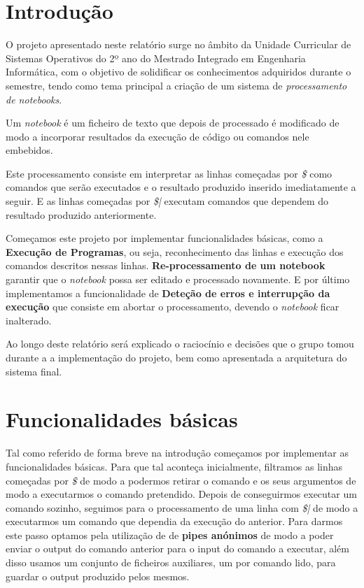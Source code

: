 \documentclass{report}
\begin{document}
\tableofcontents

\chapter{Introdução} \label{intro}

O projeto apresentado neste relatório surge no âmbito da Unidade Curricular de Sistemas Operativos do 2º ano do Mestrado Integrado em Engenharia Informática, com o objetivo de solidificar os conhecimentos adquiridos durante o semestre, tendo como tema principal a criação de um sistema de \textit{processamento de notebooks}. 

Um \textit{notebook} é um ficheiro de texto que depois de processado é modificado de modo a incorporar resultados da execução de código ou comandos nele embebidos.

Este processamento consiste em interpretar as linhas começadas por \textit{\$} como comandos que serão executados e o resultado produzido inserido imediatamente a seguir. E as linhas começadas por \textit{\$|} executam comandos que dependem do resultado produzido anteriormente.

Começamos este projeto por implementar funcionalidades básicas, como a \textbf{Execução de Programas}, ou seja, reconhecimento das linhas e execução dos comandos descritos nessas linhas. \textbf{Re-processamento de um notebook} garantir que o \textit{notebook} possa ser editado e processado novamente. E por último implementamos a funcionalidade de \textbf{ Deteção de erros e interrupção da execução} que consiste em abortar o processamento, devendo o \textit{notebook} ficar inalterado. 

Ao longo deste relatório será explicado o raciocínio e decisões que o grupo tomou durante a a implementação do projeto, bem como apresentada a arquitetura do sistema final.


\chapter{Funcionalidades básicas} \label{components}

Tal como referido de forma breve na introdução começamos por implementar as funcionalidades básicas. Para que tal aconteça inicialmente, filtramos as linhas começadas por \textit{\$} de modo a podermos retirar o comando e os seus argumentos de modo a executarmos o comando pretendido. Depois de conseguirmos executar um comando sozinho, seguimos para o processamento de uma linha com \textit{\$|} de modo a executarmos um comando que dependia da execução do anterior.
Para darmos este passo optamos pela utilização de de \textbf{pipes anónimos} de modo a poder enviar o output do comando anterior para o input do comando a executar, além disso usamos um conjunto de ficheiros auxiliares, um por comando lido, para guardar o output produzido pelos mesmos.
\end{document}
